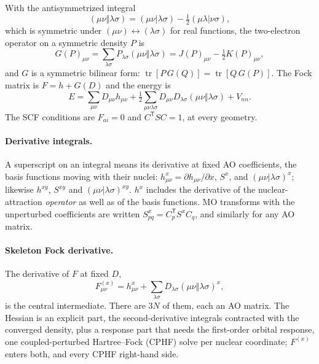 \documentclass[11pt]{article}
\newcommand{\tr}{\operatorname{tr}}
\newcommand{\asym}[2]{(#1\Vert#2)}
\newcommand{\Fsk}[1]{F^{(#1)}}
\begin{document}
With the antisymmetrized integral
\begin{equation}
  \asym{\mu\nu}{\lambda\sigma} = (\mu\nu|\lambda\sigma)
  - \tfrac12(\mu\lambda|\nu\sigma),
\end{equation}
which is symmetric under $(\mu\nu)\leftrightarrow(\lambda\sigma)$ for real
functions, the two-electron operator on a symmetric density $P$ is
\begin{equation}
  G(P)_{\mu\nu} = \sum_{\lambda\sigma} P_{\lambda\sigma}
  \asym{\mu\nu}{\lambda\sigma} = J(P)_{\mu\nu} - \tfrac12 K(P)_{\mu\nu},
\end{equation}
and $G$ is a symmetric bilinear form: $\tr[P\,G(Q)] = \tr[Q\,G(P)]$. The
Fock matrix is $F = h + G(D)$ and the energy is
\begin{equation}
  E = \sum_{\mu\nu} D_{\mu\nu} h_{\mu\nu}
  + \tfrac12 \sum_{\mu\nu\lambda\sigma} D_{\mu\nu} D_{\lambda\sigma}
  \asym{\mu\nu}{\lambda\sigma} + V_{nn}.
  \label{eq:rhf-energy}
\end{equation}
The SCF conditions are $F_{ai} = 0$ and $C^{\mathsf T} S C = 1$, at every
geometry.

\paragraph{Derivative integrals.} A superscript on an integral means its
derivative at fixed AO coefficients, the basis functions moving with their
nuclei: $h^x_{\mu\nu} = \partial h_{\mu\nu}/\partial x$, $S^x$, and
$(\mu\nu|\lambda\sigma)^x$; likewise $h^{xy}$, $S^{xy}$ and
$(\mu\nu|\lambda\sigma)^{xy}$. $h^x$ includes the derivative of the
nuclear-attraction \emph{operator} as well as of the basis functions. MO
transforms with the unperturbed coefficients are written $S^x_{pq} =
C_p^{\mathsf T} S^x C_q$, and similarly for any AO matrix.

\paragraph{Skeleton Fock derivative.} The derivative of $F$ at fixed $D$,
\begin{equation}
  \Fsk{x}_{\mu\nu} = h^x_{\mu\nu}
  + \sum_{\lambda\sigma} D_{\lambda\sigma}
  \asym{\mu\nu}{\lambda\sigma}^x,
  \label{eq:skeleton}
\end{equation}
is the central intermediate. There are $3N$ of them, each an AO matrix.
The Hessian is an explicit part, the second-derivative integrals contracted
with the converged density, plus a response part that needs the
first-order orbital response, one coupled-perturbed Hartree--Fock (CPHF)
solve per nuclear coordinate; $\Fsk{x}$ enters both, and every CPHF
right-hand side.
\end{document}
